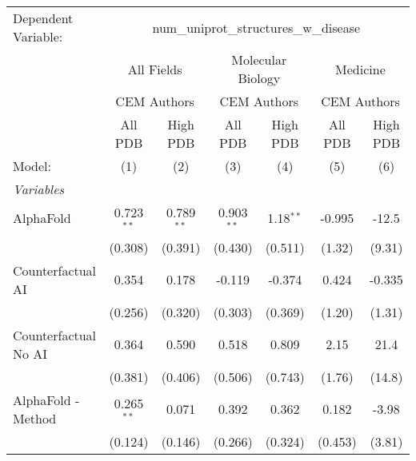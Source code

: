 \begingroup
\centering
\begin{tabular}{lcccccc}
   \tabularnewline \midrule \midrule
   Dependent Variable: & \multicolumn{6}{c}{num\_uniprot\_structures\_w\_disease}\\
 & \multicolumn{2}{c}{All Fields} & \multicolumn{2}{c}{Molecular Biology} & \multicolumn{2}{c}{Medicine} \\
\cmidrule(lr){2-3} \cmidrule(lr){4-5} \cmidrule(lr){6-7}
 & \multicolumn{2}{c}{CEM Authors} & \multicolumn{2}{c}{CEM Authors} & \multicolumn{2}{c}{CEM Authors} \\
\cmidrule(lr){2-3} \cmidrule(lr){4-5} \cmidrule(lr){6-7}
 & \multicolumn{1}{c}{All PDB} & \multicolumn{1}{c}{High PDB} & \multicolumn{1}{c}{All PDB} & \multicolumn{1}{c}{High PDB} & \multicolumn{1}{c}{All PDB} & \multicolumn{1}{c}{High PDB} \\
\cmidrule(lr){2-2} \cmidrule(lr){3-3} \cmidrule(lr){4-4} \cmidrule(lr){5-5} \cmidrule(lr){6-6} \cmidrule(lr){7-7}
   Model:                                                     & (1)          & (2)          & (3)          & (4)         & (5)        & (6)\\  
   \midrule
   \emph{Variables}\\
   AlphaFold                                                  & 0.723$^{**}$ & 0.789$^{**}$ & 0.903$^{**}$ & 1.18$^{**}$ & -0.995     & -12.5\\   
                                                              & (0.308)      & (0.391)      & (0.430)      & (0.511)     & (1.32)     & (9.31)\\   
   Counterfactual AI                                          & 0.354        & 0.178        & -0.119       & -0.374      & 0.424      & -0.335\\   
                                                              & (0.256)      & (0.320)      & (0.303)      & (0.369)     & (1.20)     & (1.31)\\   
   Counterfactual No AI                                       & 0.364        & 0.590        & 0.518        & 0.809       & 2.15       & 21.4\\   
                                                              & (0.381)      & (0.406)      & (0.506)      & (0.743)     & (1.76)     & (14.8)\\   
   AlphaFold - Method                                         & 0.265$^{**}$ & 0.071        & 0.392        & 0.362       & 0.182      & -3.98\\   
                                                              & (0.124)      & (0.146)      & (0.266)      & (0.324)     & (0.453)    & (3.81)\\   

\end{tabular}
